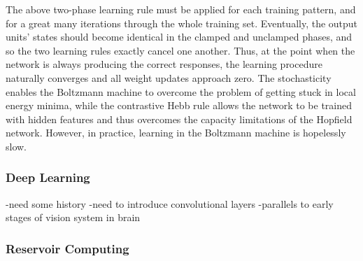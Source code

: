 The above two-phase learning rule must be applied for each training pattern, and for a great many iterations through the whole training set. Eventually, the output units' states should become identical in the clamped and unclamped phases, and so the two learning rules exactly cancel one another. Thus, at the point when the network is always producing the correct responses, the learning procedure naturally converges and all weight updates approach zero.
The stochasticity enables the Boltzmann machine to overcome the problem of getting stuck in local energy minima, while the contrastive Hebb rule allows the network to be trained with hidden features and thus overcomes the capacity limitations of the Hopfield network. However, in practice, learning in the Boltzmann machine is hopelessly slow.

\subsubsection{Deep Learning}
-need some history
-need to introduce convolutional layers
-parallels to early stages of vision system in brain



\subsubsection{Reservoir Computing}

\cite{jaha2004}

\cite{mana2002}
